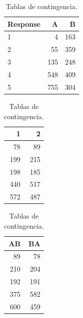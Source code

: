 \documentclass[
  12pt,
  a4paper,
  extrafontsizes,
  onecolumn,
  openright,
  table]{memoir}
\begin{document}
\begin{table}

\caption{\label{tbl-contingencia-2}Tablas de
contingencia.}\begin{minipage}[t]{0.33\linewidth}

{\centering 

\tabularnewline

\centering
\begin{tabular}{l|r|r}
\hline
Response & A & B\\
\hline
1 & 4 & 163\\
\hline
2 & 55 & 359\\
\hline
3 & 135 & 248\\
\hline
4 & 548 & 409\\
\hline
5 & 755 & 304\\
\hline
\end{tabular}

}

\end{minipage}%
%
\begin{minipage}[t]{0.33\linewidth}

{\centering 

\tabularnewline

\centering
\begin{tabular}{r|r}
\hline
1 & 2\\
\hline
78 & 89\\
\hline
199 & 215\\
\hline
198 & 185\\
\hline
440 & 517\\
\hline
572 & 487\\
\hline
\end{tabular}

}

\end{minipage}%
%
\begin{minipage}[t]{0.33\linewidth}

{\centering 

\tabularnewline

\centering
\begin{tabular}{r|r}
\hline
AB & BA\\
\hline
89 & 78\\
\hline
210 & 204\\
\hline
192 & 191\\
\hline
375 & 582\\
\hline
600 & 459\\
\hline
\end{tabular}

}

\end{minipage}%

\end{table}
\end{document}
